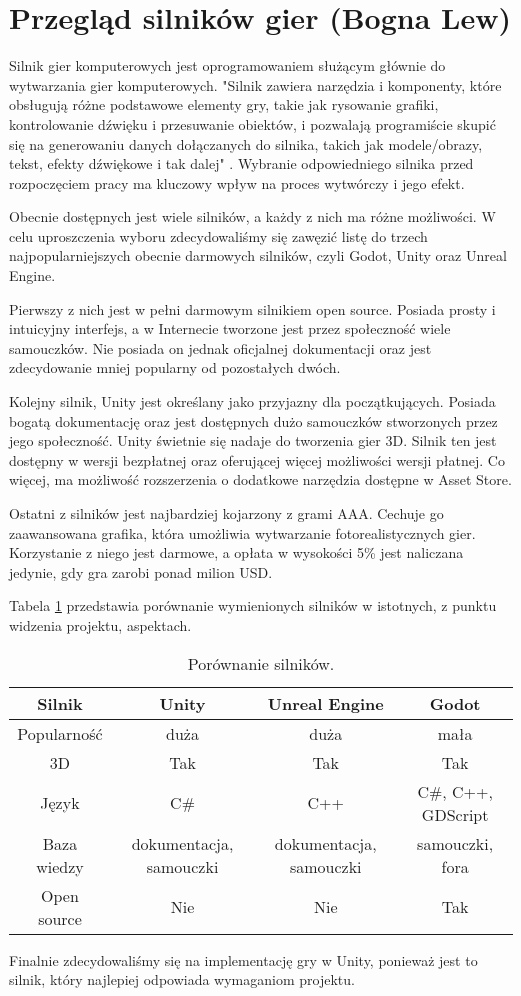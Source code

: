 \section{Przegląd silników gier (Bogna Lew)}\label{s:silniki}
Silnik gier komputerowych jest oprogramowaniem służącym głównie do wytwarzania gier komputerowych. "Silnik zawiera
narzędzia i komponenty, które obsługują różne podstawowe elementy gry, takie jak rysowanie grafiki, kontrolowanie
dźwięku i przesuwanie obiektów, i pozwalają programiście skupić się na generowaniu danych dołączanych do silnika, takich
jak modele/obrazy, tekst, efekty dźwiękowe i tak dalej" \cite{design_essent}. Wybranie odpowiedniego silnika przed
rozpoczęciem pracy ma kluczowy wpływ na proces wytwórczy i jego efekt.

Obecnie dostępnych jest wiele silników, a każdy z nich ma różne możliwości. W celu uproszczenia wyboru zdecydowaliśmy
się zawęzić listę do trzech najpopularniejszych obecnie darmowych silników, czyli Godot, Unity oraz Unreal Engine.

Pierwszy z nich jest w pełni darmowym silnikiem open source. Posiada prosty i intuicyjny interfejs, a w Internecie
tworzone jest przez społeczność wiele samouczków. Nie posiada on jednak oficjalnej dokumentacji oraz jest zdecydowanie
mniej popularny od pozostałych dwóch.

Kolejny silnik, Unity jest określany jako przyjazny dla początkujących. Posiada bogatą dokumentację oraz jest dostępnych
dużo samouczków stworzonych przez jego społeczność. Unity świetnie się nadaje do tworzenia gier 3D. Silnik ten jest
dostępny w wersji bezpłatnej oraz oferującej więcej możliwości wersji płatnej. Co więcej, ma możliwość rozszerzenia
o dodatkowe narzędzia dostępne w Asset Store.

Ostatni z silników jest najbardziej kojarzony z grami AAA. Cechuje go zaawansowana grafika, która umożliwia wytwarzanie
fotorealistycznych gier. Korzystanie z niego jest darmowe, a opłata w wysokości 5\% jest naliczana jedynie, gdy gra
zarobi ponad milion USD.

Tabela \ref{fig:teng} przedstawia porównanie wymienionych silników w istotnych, z punktu widzenia projektu, aspektach.

\begin{table}[h]
\caption{Porównanie silników.}
\begin{center}
\begin{tabular}{ |c||c|c|c| }
 \hline
 Silnik & Unity & Unreal Engine & Godot \\
 \hline \hline
 Popularność & duża & duża & mała \\
 \hline
 3D & Tak & Tak & Tak \\
 \hline
 Język & C\# & C++ & C\#, C++, GDScript \\
 \hline
 Baza wiedzy & dokumentacja, samouczki & dokumentacja, samouczki & samouczki, fora \\
 \hline
 Open source & Nie & Nie & Tak \\
 \hline
\end{tabular}
\end{center}
\label{fig:teng} 
\end{table}

Finalnie zdecydowaliśmy się na implementację gry w Unity, ponieważ jest to silnik, który najlepiej odpowiada wymaganiom projektu.

